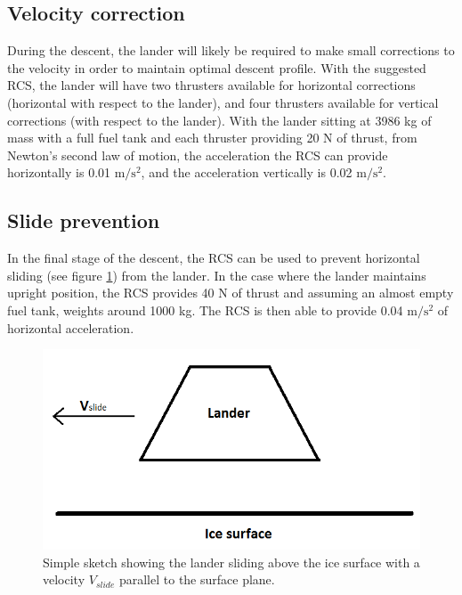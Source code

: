 \subsection{Velocity correction}

During the descent, the lander will likely be required to make small corrections to the velocity in order to maintain optimal descent profile. With the suggested RCS, the lander will have two thrusters available for horizontal corrections (horizontal with respect to the lander), and four thrusters available for vertical corrections (with respect to the lander). With the lander sitting at 3986 kg of mass with a full fuel tank and each thruster providing 20 N of thrust, from Newton's second law of motion, the acceleration the RCS can provide horizontally is 0.01 $\mathrm{m/s^2}$, and the acceleration vertically is 0.02 $\mathrm{m/s^2}$. 

\subsection{Slide prevention}

In the final stage of the descent, the RCS can be used to prevent horizontal sliding (see figure \ref{fig:lunar_slide}) from the lander. In the case where the lander maintains upright position, the RCS provides 40 N of thrust and assuming an almost empty fuel tank, weights around 1000 kg. The RCS is then able to provide 0.04 $\mathrm{m/s^2}$ of horizontal acceleration.\\

\begin{figure}[htb]
\begin{center}
\includegraphics[scale=0.6]{figures/RCS/Lunar_slide}
\caption{Simple sketch showing the lander sliding above the ice surface with a velocity $V_{slide}$ parallel to the surface plane.}
\label{fig:lunar_slide}
\end{center}
\end{figure}

